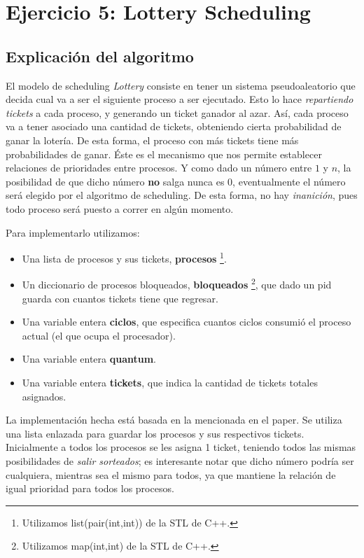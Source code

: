 \documentclass[a4paper]{article}
\begin{document}
\section{Ejercicio 5: Lottery Scheduling}
\subsection{Explicación del algoritmo}
El modelo de scheduling \textit{Lottery} consiste en tener un sistema
pseudoaleatorio que decida cual va a ser el siguiente proceso a ser
ejecutado. Esto lo hace \textit{repartiendo tickets} a cada proceso, y
generando un ticket ganador al azar. Así, cada
proceso va a tener asociado una cantidad de tickets, obteniendo
cierta probabilidad de ganar la lotería. De esta forma, el proceso con más
tickets tiene más probabilidades de ganar. Éste es el mecanismo que nos
permite establecer relaciones de prioridades entre procesos.
Y como dado un número entre $1$ y $n$, la posibilidad de que dicho número
\textbf{no} salga nunca es $0$, eventualmente el número será elegido por el
algoritmo de scheduling. De esta forma, no hay \textit{inanición}, pues
todo proceso será puesto a correr en algún momento.

Para implementarlo utilizamos:
\begin{itemize}
\item Una lista de procesos y sus tickets, \textbf{procesos}
\footnote{Utilizamos list(pair(int,int)) de la STL de C++.}.
\item Un diccionario de procesos bloqueados, \textbf{bloqueados}
\footnote{Utilizamos map(int,int) de la STL de C++.}, que dado un pid guarda con cuantos
tickets tiene que regresar.
\item Una variable entera \textbf{ciclos}, que especifica cuantos ciclos
consumió el proceso actual (el que ocupa el procesador).
\item Una variable entera \textbf{quantum}.
\item Una variable entera \textbf{tickets}, que indica la cantidad de
tickets totales asignados.
\end{itemize}

La implementación hecha está basada en la mencionada en el paper. Se utiliza
una lista enlazada para guardar los procesos y sus respectivos tickets.
Inicialmente a todos los procesos se les asigna 1 ticket, teniendo todos las
mismas posibilidades de \textit{salir sorteados}; es interesante notar que
dicho número podría ser cualquiera, mientras sea el mismo para todos, ya que
mantiene la relación de igual prioridad para todos los procesos.
\end{document}
